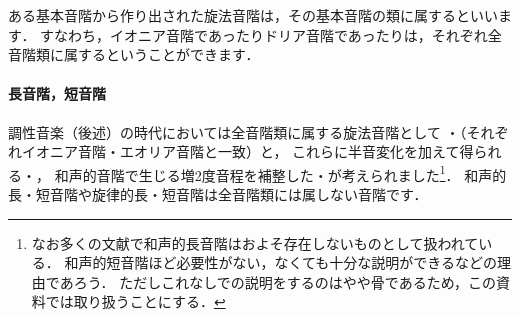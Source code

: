 \documentclass[dvipdfmx,uplatex,b5paper,openany,jbase=12Q,nomag*,textwidth-limit=44%
               ]{gachimuchi}
\begin{document}
\begin{Music}[0.95\linewidth]
  \en\setdoublebar\nopagebreak\alaligne%
  \Notes{}%
  \en\doublebar%
  \Notes{}%
  \en\doublebar%
  \Notes{}%
  \en\doublebar%
  \Notes{}%
  \en\setdoublebar%
  \endpiece%
\end{Music}

ある基本音階から作り出された旋法音階は，その基本音階の類に属するといいます．
すなわち，イオニア音階であったりドリア音階であったりは，それぞれ全音階類に属するということができます．

\paragraph{長音階，短音階}
調性音楽（後述）の時代においては全音階類に属する旋法音階として
・（それぞれイオニア音階・エオリア音階と一致）と，
これらに半音変化を加えて得られる・，
和声的音階で生じる増2度音程を補整した・が考えられました\footnote{%
  なお多くの文献で和声的長音階はおよそ存在しないものとして扱われている．
  和声的短音階ほど必要性がない，なくても十分な説明ができるなどの理由であろう．
  ただしこれなしで\Gniv\Min{}の説明をするのはやや骨であるため，この資料では取り扱うことにする．
}．
和声的長・短音階や旋律的長・短音階は全音階類には属しない音階です．
\end{document}
